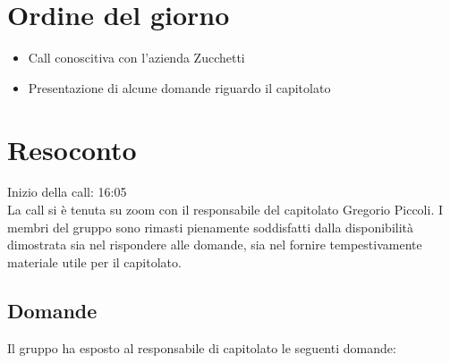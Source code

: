 \section{Ordine del giorno}

\begin{itemize}
	\item Call conoscitiva con l'azienda Zucchetti
	\item Presentazione di alcune domande riguardo il capitolato
\end{itemize}

\section{Resoconto}

\noindent 
Inizio della call: 16:05 \\

\noindent La call si è tenuta su zoom con il responsabile del capitolato Gregorio Piccoli. 
I membri del gruppo sono rimasti pienamente soddisfatti dalla disponibilità dimostrata sia nel rispondere alle domande, sia nel fornire tempestivamente materiale utile per il capitolato.

\subsection{Domande}

Il gruppo ha esposto al responsabile di capitolato le seguenti domande:

